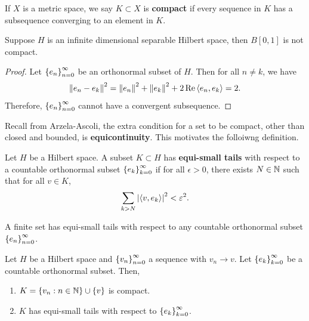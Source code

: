 \documentclass[a4paper]{article}
\begin{document}
\begin{defi}[Compact]
If $X$ is a metric space, we say $K \subset X$ 
is \textbf{compact} if every sequence in $K$ 
has a subsequence converging to an element in $K$.
\end{defi}

\begin{eg}
Suppose $H$ is an infinite dimensional separable 
Hilbert space, then $B[0, 1]$ is not compact.
\end{eg}

\begin{proof}
  Let $\left\{ e_n \right\}_{n=0}^\infty$ be an orthonormal subset of $H$. 
  Then for all $n \neq k$, we have 
  \[
  \left\lVert e_n - e_k\right\rVert^2 = \left\lVert e_n\right\rVert^2 + \left\lVert e_k\right\rVert^2 
  + 2 \operatorname{Re} \left\langle e_n, e_k \right\rangle = 2.
  \]
  Therefore, $\left\{ e_n \right\}_{n=0}^\infty$ cannot have a convergent 
  subsequence.
\end{proof}

Recall from Arzela-Ascoli, the extra condition for a 
set to be compact, other than closed and bounded,
is \textbf{equicontinuity}. 
This motivates the folloiwng definition. 

\begin{defi}
Let $H$ be a Hilbert space. A subset $K \subset H$ has 
\textbf{equi-small tails} with respect to a countable 
orthonormal subset $\left\{ e_k \right\}_{k=0}^\infty$ if for all 
$\epsilon > 0$, there exists $N \in \mathbb{N}$ such that 
for all $v \in K$, 
\[
\sum_{k > N} \left\lvert \left\langle v, e_k \right\rangle\right\rvert^2 < \varepsilon^2.
\]
\end{defi}

\begin{eg}
A finite set has equi-small tails with respect to 
any countable orthonormal subset $\left\{ e_n \right\}_{n=0}^\infty$.
\end{eg}

\begin{thm}
Let $H$ be a Hilbert space and $\left\{ v_n \right\}_{n=0}^\infty$
a sequence with $v_n \to v$. Let $\left\{ e_k \right\}_{k=0}^\infty$
be a countable orthonormal subset. Then, 
\begin{enumerate}
  \item $K = \left\{ v_n : n \in \mathbb{N} \right\}
  \cup \left\{ v \right\}$ is compact. 
  
  \item $K$ has equi-small tails with respect to 
  $\left\{ e_k \right\}_{k=0}^\infty$.
\end{enumerate}
\end{thm}
\end{document}
